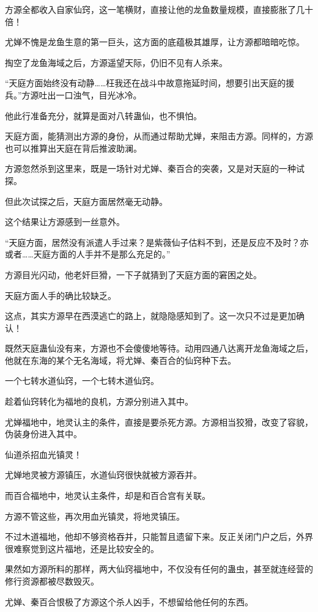 \begin{this_body}
方源全都收入自家仙窍，这一笔横财，直接让他的龙鱼数量规模，直接膨胀了几十倍！

尤婵不愧是龙鱼生意的第一巨头，这方面的底蕴极其雄厚，让方源都暗暗吃惊。

掏空了龙鱼海域之后，方源遥望天际，仍旧不见有人杀来。

“天庭方面始终没有动静……枉我还在战斗中故意拖延时间，想要引出天庭的援兵。”方源吐出一口浊气，目光冰冷。

他此行准备充分，就算是面对八转蛊仙，也不惧怕。

天庭方面，能猜测出方源的身份，从而通过帮助尤婵，来阻击方源。同样的，方源也可以推算出天庭在背后推波助澜。

方源忽然杀到这里来，既是一场针对尤婵、秦百合的突袭，又是对天庭的一种试探。

但此次试探之后，天庭方面居然毫无动静。

这个结果让方源感到一丝意外。

“天庭方面，居然没有派遣人手过来？是紫薇仙子估料不到，还是反应不及时？亦或者……天庭方面的人手并不是那么充足的。”

方源目光闪动，他老奸巨猾，一下子就猜到了天庭方面的窘困之处。

天庭方面人手的确比较缺乏。

这点，其实方源早在西漠逃亡的路上，就隐隐感知到了。这一次只不过是更加确认！

既然天庭蛊仙没有来，方源也不会傻傻地等待。动用四通八达离开龙鱼海域之后，他就在东海的某个无名海域，将尤婵、秦百合的仙窍种下去。

一个七转水道仙窍，一个七转木道仙窍。

趁着仙窍转化为福地的良机，方源分别进入其中。

尤婵福地中，地灵认主的条件，直接是要杀死方源。方源相当狡猾，改变了容貌，伪装身份进入其中。

仙道杀招血光镇灵！

尤婵地灵被方源镇压，水道仙窍很快就被方源吞并。

而百合福地中，地灵认主条件，却是和百合宫有关联。

方源不管这些，再次用血光镇灵，将地灵镇压。

不过木道福地，他却不够资格吞并，只能暂且遗留下来。反正关闭门户之后，外界很难察觉到这片福地，还是比较安全的。

果然如方源所料的那样，两大仙窍福地中，不仅没有任何的蛊虫，甚至就连经营的修行资源都被尽数毁灭。

尤婵、秦百合恨极了方源这个杀人凶手，不想留给他任何的东西。


\end{this_body}

